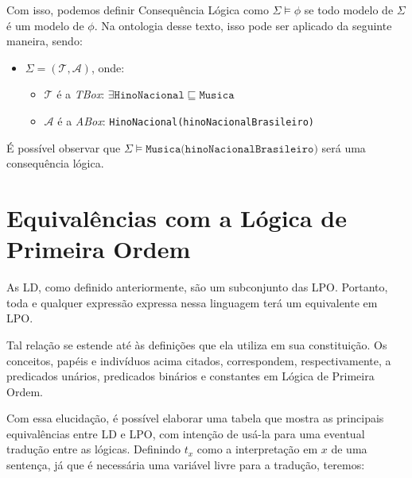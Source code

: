 Com isso, podemos definir Consequência Lógica como $ \Sigma \models \phi $ se todo modelo de $ \Sigma $ é um modelo de $ \phi $. Na ontologia desse texto, isso pode ser aplicado da seguinte maneira, sendo:

\begin{itemize}
	\item $ \Sigma = (\mathcal{T}, \mathcal{A}) $, onde:
	\begin{itemize}
		\item $ \mathcal{T} $ é a \textit{TBox}: $ \exists \texttt{HinoNacional} \sqsubseteq \texttt{Musica}$
		\item $ \mathcal{A} $ é a \textit{ABox}: \texttt{HinoNacional(hinoNacionalBrasileiro)}
	\end{itemize}
\end{itemize}

É possível observar que $ \Sigma \models \texttt{Musica(hinoNacionalBrasileiro)} $ será uma consequência lógica.

\section{Equivalências com a Lógica de Primeira Ordem}

As LD, como definido anteriormente, são um subconjunto das LPO. Portanto, toda e qualquer expressão expressa nessa linguagem terá um equivalente em LPO. 

Tal relação se estende até às definições que ela utiliza em sua constituição. Os conceitos, papéis e indivíduos acima citados, correspondem, respectivamente, a predicados unários, predicados binários e constantes em Lógica de Primeira Ordem.

Com essa elucidação, é possível elaborar uma tabela que mostra as principais equivalências entre LD e LPO, com intenção de usá-la para uma eventual tradução entre as lógicas. Definindo $t_x$ como a interpretação em $x$ de uma sentença, já que é necessária uma variável livre para a tradução, teremos:

